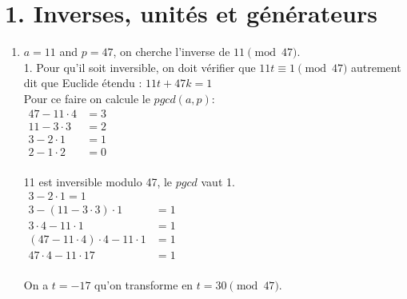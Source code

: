 
\section*{1. Inverses, unités et générateurs}

\begin{solution}
    \text{ }
    \begin{enumerate}[label=(\alph*)]
        \item $a = 11$ and $p = 47$, on cherche l'inverse de $11 \pmod{47}$. \\
        1. Pour qu'il soit inversible, on doit vérifier que $11t \equiv 1 \pmod{47}$ autrement dit que Euclide étendu : $11 t + 47 k = 1$ \\
        Pour ce faire on calcule le $pgcd{(a, p)} :$ \\
        \(
        \begin{aligned}
            47 - 11 \cdot 4 &= 3 \\
            11 - 3 \cdot 3 &= 2 \\
            3 - 2 \cdot 1 &= 1 \\
            2 - 1 \cdot 2 &= 0 \\
        \end{aligned}
        \)

        11 est inversible modulo 47, le $pgcd$ vaut 1. \\

        \(
        \begin{aligned}
            3 - 2 \cdot 1 = 1 \\
            3 - (11 - 3 \cdot 3) \cdot 1 &= 1 \\
            3 \cdot 4 - 11 \cdot 1 &= 1 \\
            (47 - 11 \cdot 4) \cdot 4 - 11 \cdot 1 &= 1 \\
            47 \cdot 4 - 11 \cdot 17 &= 1 \\
        \end{aligned}
        \)

        On a $ t = -17$ qu'on transforme en $t = 30 \pmod{47}$. \\


\end{enumerate}
\end{solution}
